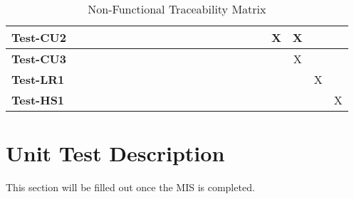\documentclass[12pt, titlepage]{article}
\begin{document}
\begin{landscape}
\begin{table}[H]
\begin{adjustwidth}{-0.3in}{-0.5in}
{\begin{tabular}{c|c|c|c|c|c|c|c|c|c|c|c|c|c|c|c|c|c|c|c|c|c|}
\multicolumn{1}{|l|}{\textbf{Test-CU2}}   &             &             &             &             &             &              &             &             &              &              &              &             &              &             &             &         &&X&X&&     \\ \hline
\multicolumn{1}{|l|}{\textbf{Test-CU3}}   &             &             &             &             &             &              &             &             &              &              &              &             &              &             &             &         &&&X&&     \\ \hline
\multicolumn{1}{|l|}{\textbf{Test-LR1}}   &             &             &             &             &             &              &             &             &              &              &              &             &              &             &             &         &&&&X&     \\ \hline
\multicolumn{1}{|l|}{\textbf{Test-HS1}}   &             &             &             &             &             &              &             &             &              &              &              &             &              &             &             &         &&&&& X    \\ \hline


\end{tabular}

}
\caption{Non-Functional Traceability Matrix}
    \label{tab:matrix3}
\end{adjustwidth}
\end{table}
\end{landscape}

\section{Unit Test Description}
This section will be filled out once the MIS is completed. 


\end{document}
